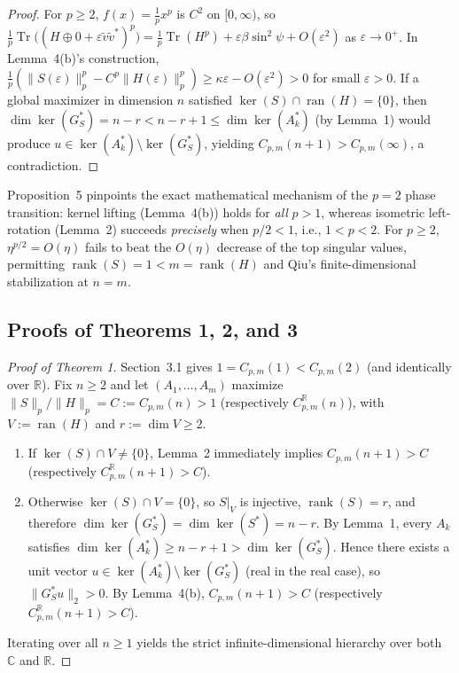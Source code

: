 \documentclass[10pt,letterpaper]{article}
\newcommand{\C}{\mathbb{C}}
\newcommand{\R}{\mathbb{R}}
\newcommand{\Tr}{\operatorname{Tr}}
\newcommand{\ran}{\operatorname{ran}}
\newcommand{\rank}{\operatorname{rank}}
\begin{document}
\begin{proof}
For $p \ge 2$, $f(x) = \frac{1}{p}x^p$ is $C^2$ on $[0,\infty)$, so $\frac{1}{p}\Tr\bigl((H \oplus 0 + \varepsilon\tilde{v}\tilde{v}^*)^p\bigr) = \frac{1}{p}\Tr(H^p) + \varepsilon\beta\sin^2\psi + O(\varepsilon^2)$ as $\varepsilon \to 0^+$. In Lemma~4(b)'s construction, $\frac{1}{p}(\|S(\varepsilon)\|_p^p - C^p\|H(\varepsilon)\|_p^p) \ge \kappa\varepsilon - O(\varepsilon^2) > 0$ for small $\varepsilon > 0$. If a global maximizer in dimension $n$ satisfied $\ker(S) \cap \ran(H) = \{0\}$, then $\dim\ker(G_S^*) = n - r < n - r + 1 \le \dim\ker(A_k^*)$ (by Lemma~1) would produce $u \in \ker(A_k^*) \setminus \ker(G_S^*)$, yielding $C_{p,m}(n+1) > C_{p,m}(\infty)$, a contradiction.
\end{proof}

Proposition~5 pinpoints the exact mathematical mechanism of the $p = 2$ phase transition: kernel lifting (Lemma~4(b)) holds for \emph{all} $p > 1$, whereas isometric left-rotation (Lemma~2) succeeds \emph{precisely} when $p/2 < 1$, i.e., $1 < p < 2$. For $p \ge 2$, $\eta^{p/2} = O(\eta)$ fails to beat the $O(\eta)$ decrease of the top singular values, permitting $\rank(S) = 1 < m = \rank(H)$ and Qiu's finite-dimensional stabilization at $n = m$.

\subsection{Proofs of Theorems 1, 2, and 3}

\begin{proof}[Proof of Theorem 1]
Section~3.1 gives $1 = C_{p,m}(1) < C_{p,m}(2)$ (and identically over $\R$). Fix $n \ge 2$ and let $(A_1,\dots,A_m)$ maximize $\|S\|_p / \|H\|_p = C := C_{p,m}(n) > 1$ (respectively $C_{p,m}^{\R}(n)$), with $V := \ran(H)$ and $r := \dim V \ge 2$.
\begin{enumerate}[leftmargin=1.6em,itemsep=2pt]
  \item If $\ker(S) \cap V \neq \{0\}$, Lemma~2 immediately implies $C_{p,m}(n+1) > C$ (respectively $C_{p,m}^{\R}(n+1) > C$).
  \item Otherwise $\ker(S) \cap V = \{0\}$, so $S|_V$ is injective, $\rank(S) = r$, and therefore $\dim\ker(G_S^*) = \dim\ker(S^*) = n - r$. By Lemma~1, every $A_k$ satisfies $\dim\ker(A_k^*) \ge n - r + 1 > \dim\ker(G_S^*)$. Hence there exists a unit vector $u \in \ker(A_k^*) \setminus \ker(G_S^*)$ (real in the real case), so $\|G_S^* u\|_2 > 0$. By Lemma~4(b), $C_{p,m}(n+1) > C$ (respectively $C_{p,m}^{\R}(n+1) > C$).
\end{enumerate}
Iterating over all $n \ge 1$ yields the strict infinite-dimensional hierarchy over both $\C$ and $\R$.
\end{proof}
\end{document}
